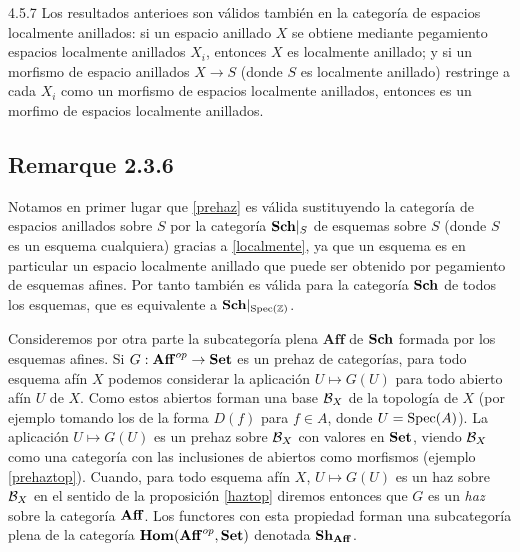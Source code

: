 \documentclass[twoside]{article}
\begin{document}
\begin{remarque}{4.5.7}\label{localmente}
Los resultados anterioes son válidos también en la categoría de espacios localmente anillados: si un espacio anillado $X$ se obtiene mediante pegamiento espacios localmente anillados $X_i$, entonces $X$ es localmente anillado; y si un morfismo de espacio anillados $X\to S$ (donde $S$ es localmente anillado) restringe a cada $X_i$ como un morfismo de espacios localmente anillados, entonces es un morfimo de espacios localmente anillados. 
\end{remarque}



\subsection{Remarque 2.3.6}

Notamos en primer lugar que \ref{prehaz} es válida sustituyendo la categoría de espacios anillados sobre $S$ por la categoría $\mathrm{\mathbf{Sch}}|_{S}$ de esquemas sobre $S$ (donde $S$ es un esquema cualquiera) gracias a \ref{localmente}, ya que un esquema es en particular un espacio localmente anillado que puede ser obtenido por pegamiento de esquemas afines. Por tanto también es válida para la categoría $\mathrm{\mathbf{Sch}}$ de todos los esquemas, que es equivalente a $\mathrm{\mathbf{Sch}}|_{\operatorname{Spec}(\mathbb{Z})}$. %

Consideremos por otra parte la subcategoría plena $\mathrm{\mathbf{Aff}}$ de $\mathrm{\mathbf{Sch}}$ formada por los esquemas afines. Si $G:\mathrm{\mathbf{Aff}}^{op}\to\mathrm{\mathbf{Set}}$ es un prehaz de categorías, para todo esquema afín $X$ podemos considerar la aplicación $U\mapsto G(U)$ para todo abierto afín $U$ de $X$. Como estos abiertos forman una base ${\mathcal B}_X$ de la topología de $X$ (por ejemplo tomando los de la forma $D(f)$ para $f\in A$, donde $U=\operatorname{Spec}(A)$). La aplicación $U\mapsto G(U)$ es un prehaz sobre ${\mathcal B}_X$ con valores en $\mathrm{\mathbf{Set}}$, viendo ${\mathcal B}_X$ como una categoría con las inclusiones de abiertos como morfismos (ejemplo \ref{prehaztop}). Cuando, para todo esquema afín $X$, $U\mapsto G(U)$ es un haz sobre ${\mathcal B}_X$ en el sentido de la proposición \ref{haztop} diremos entonces que $G$ es un \emph{haz} sobre la categoría $\mathrm{\mathbf{Aff}}$. Los functores con esta propiedad forman una subcategoría plena de la categoría $\mathrm{\mathbf{Hom}}(\mathrm{\mathbf{Aff}}^{op},\mathrm{\mathbf{Set}})$ denotada $\mathrm{\mathbf{Sh}}_{\mathrm{\mathbf{Aff}}}$. 
\end{document}

